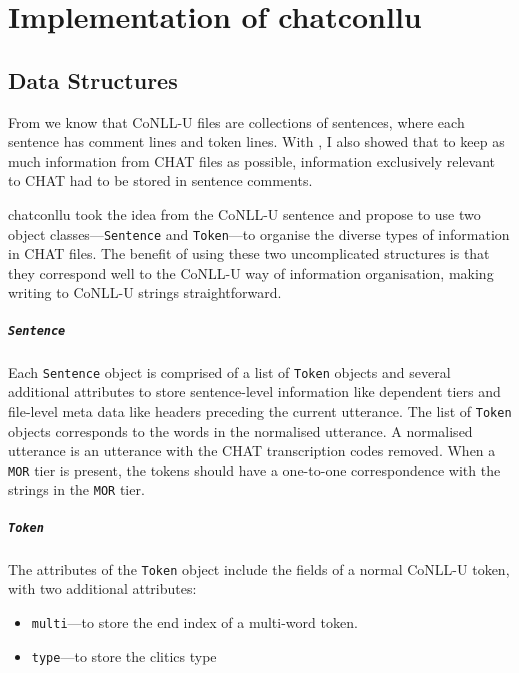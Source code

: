 \chapter{Implementation of chatconllu} %

\label{Chapter3} %

\section{Data Structures}
From  we know that CoNLL-U files are collections of sentences, where each sentence has comment lines and token lines. With , I also showed that to keep as much information from CHAT files as possible, information exclusively relevant to CHAT had to be stored in sentence comments.

chatconllu took the idea from the CoNLL-U sentence and propose to use two object classes---\texttt{Sentence} and \texttt{Token}---to organise the diverse types of information in CHAT files. The benefit of using these two uncomplicated structures is that they correspond well to the CoNLL-U way of information organisation, making writing to CoNLL-U strings straightforward.

\paragraph{\texttt{Sentence}}

Each \texttt{Sentence} object is comprised of a list of \texttt{Token} objects and several additional attributes to store sentence-level information like dependent tiers and file-level meta data like headers preceding the current utterance. The list of \texttt{Token} objects corresponds to the words in the normalised utterance. A normalised utterance is an utterance with the CHAT transcription codes removed. When a \texttt{MOR} tier is present, the tokens should have a one-to-one correspondence with the strings in the \texttt{MOR} tier.

\paragraph{\texttt{Token}}

The attributes of the \texttt{Token} object include the  fields of a normal CoNLL-U token, with two additional attributes:
\begin{itemize}
	\item \texttt{multi}---to store the end index of a multi-word token.
	\item \texttt{type}---to store the clitics type
\end{itemize}

